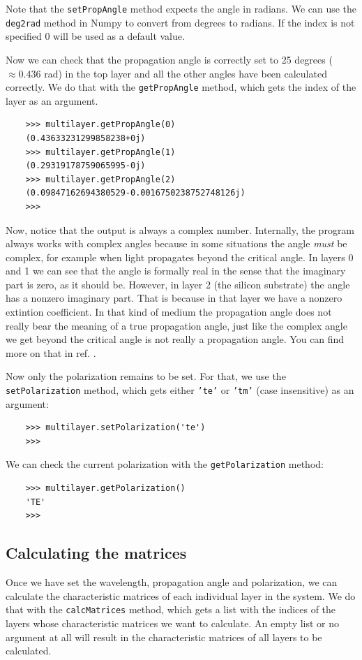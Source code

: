 \documentclass[a4paper,11pt,aps,final]{revtex4}
\begin{document}
Note that the \texttt{setPropAngle} method expects the angle in radians. We can use the \texttt{deg2rad} method in \textsf{Numpy} to convert from degrees to radians. If the index is not specified 0 will be used as a default value.

Now we can check that the propagation angle is correctly set to 25 degrees ($\approx 0.436$ rad) in the top layer and all the other angles have been calculated correctly. We do that with the \texttt{getPropAngle} method, which gets the index of the layer as an argument.
\begin{verbatim}
    >>> multilayer.getPropAngle(0)
    (0.43633231299858238+0j)
    >>> multilayer.getPropAngle(1)
    (0.29319178759065995-0j)
    >>> multilayer.getPropAngle(2)
    (0.09847162694380529-0.0016750238752748126j)
    >>>
\end{verbatim}

Now, notice that the output is always a complex number. Internally, the program always works with complex angles because in some situations the angle \emph{must} be complex, for example when light propagates beyond the critical angle. In layers 0 and 1 we can see that the angle is formally real in the sense that the imaginary part is zero, as it should be. However, in layer 2 (the silicon substrate) the angle has a nonzero imaginary part. That is because in that layer we have a nonzero extintion coefficient. In that kind of medium the propagation angle does not really bear the meaning of a true propagation angle, just like the complex angle we get beyond the critical angle is not really a propagation angle. You can find more on that in ref. .

Now only the polarization remains to be set. For that, we use the \texttt{setPolarization} method, which gets either \texttt{'te'} or \texttt{'tm'} (case insensitive) as an argument:
\begin{verbatim}
    >>> multilayer.setPolarization('te')
    >>>
\end{verbatim}

We can check the current polarization with the \texttt{getPolarization} method:
\begin{verbatim}
    >>> multilayer.getPolarization()
    'TE'
    >>>
\end{verbatim}

\subsection{Calculating the matrices}
Once we have set the wavelength, propagation angle and polarization, we can calculate the characteristic matrices of each individual layer in the system. We do that with the \texttt{calcMatrices} method, which gets a list with the indices of the layers whose characteristic matrices we want to calculate. An empty list or no argument at all will result in the characteristic matrices of all layers to be calculated.
\end{document}
